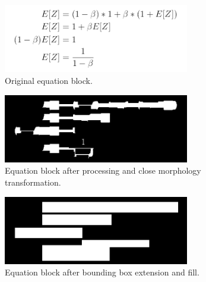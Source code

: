 \documentclass[10pt]{IEEEtran}
\begin{document}
\begin{figure}[h]
  \centering
    \includegraphics[width=3.2in]{eqblock1.png}
  \caption{Original equation block.}
  \label{fig:eqblock1}
\end{figure}

\begin{figure}[h]
  \centering
    \includegraphics[width=3.2in]{eqblock1-morph.png}
  \caption{Equation block after processing and close morphology transformation.}
  \label{fig:eqblock2}
\end{figure}

\begin{figure}[h]
  \centering
    \includegraphics[width=3.2in]{eqblock1-morph2.png}
  \caption{Equation block after bounding box extension and fill.}
  \label{fig:eqblock3}
\end{figure}
\end{document}
